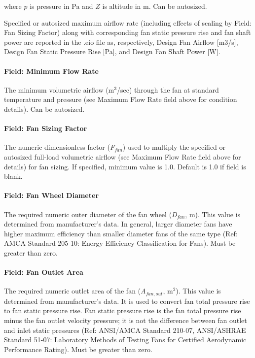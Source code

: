 where \(p\) is pressure in Pa and \(Z\) is altitude in m. Can be autosized.

Specified or autosized maximum airflow rate (including effects of scaling by Field: Fan Sizing Factor) along with corresponding fan static pressure rise and fan shaft power are reported in the .eio file as, respectively, Design Fan Airflow {[}m3/s{]}, Design Fan Static Pressure Rise {[}Pa{]}, and Design Fan Shaft Power {[}W{]}.

\paragraph{Field: Minimum Flow Rate}\label{field-minimum-flow-rate}

The minimum volumetric airflow (m\(^{3}\)/sec) through the fan at standard temperature and pressure (see Maximum Flow Rate field above for condition details). Can be autosized.

\paragraph{Field: Fan Sizing Factor}\label{field-fan-sizing-factor}

The numeric dimensionless factor (\emph{F\(_{fan}\)}) used to multiply the specified or autosized full-load volumetric airflow (see Maximum Flow Rate field above for details) for fan sizing. If specified, minimum value is 1.0. Default is 1.0 if field is blank.

\paragraph{Field: Fan Wheel Diameter}\label{field-fan-wheel-diameter}

The required numeric outer diameter of the fan wheel (\emph{D\(_{fan}\)}, m). This value is determined from manufacturer's data. In general, larger diameter fans have higher maximum efficiency than smaller diameter fans of the same type (Ref: AMCA Standard 205-10: Energy Efficiency Classification for Fans). Must be greater than zero.

\paragraph{Field: Fan Outlet Area}\label{field-fan-outlet-area}

The required numeric outlet area of the fan (\emph{A\(_{fan,out}\)}, m\(^{2}\)). This value is determined from manufacturer's data. It is used to convert fan total pressure rise to fan static pressure rise. Fan static pressure rise is the fan total pressure rise minus the fan outlet velocity pressure; it is not the difference between fan outlet and inlet static pressures (Ref: ANSI/AMCA Standard 210-07, ANSI/ASHRAE Standard 51-07: Laboratory Methods of Testing Fans for Certified Aerodynamic Performance Rating). Must be greater than zero.


